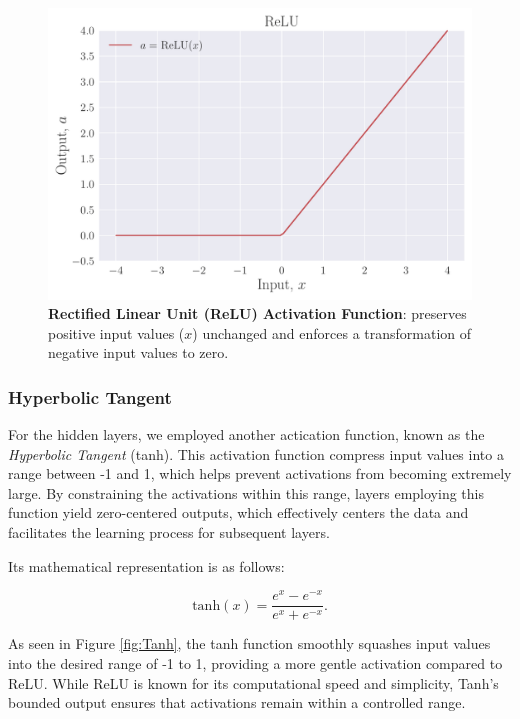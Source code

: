 \documentclass[a4paper, UKenglish, 11pt]{uiomaster}
\begin{document}
\begin{figure}
    \centering
    \includegraphics[width=\linewidth]{figures/ReLU.pdf}
    \caption{\textbf{Rectified Linear Unit (ReLU) Activation Function}: preserves positive input values ($x$) unchanged and enforces a transformation of negative input values to zero.}
    \label{fig:ReLU}
\end{figure}


\subsubsection{Hyperbolic Tangent}
For the hidden layers, we employed another actication function, known as the \emph{Hyperbolic Tangent} (tanh). This activation function compress input values into a range between -1 and 1, which helps prevent activations from becoming extremely large.  By constraining the activations within this range, layers employing this function yield zero-centered outputs, which effectively centers the data and facilitates the learning process for subsequent layers.

Its mathematical representation is as follows:

\begin{equation}
  \text{tanh}(x) = \frac{{e^x - e^{-x}}}{{e^x + e^{-x}}}.
\label{eq:I}
\end{equation}

As seen in Figure \ref{fig:Tanh}, the tanh function smoothly squashes input values into the desired range of -1 to 1, providing a more gentle activation compared to ReLU. While ReLU is known for its computational speed and simplicity, Tanh's bounded output ensures that activations remain within a controlled range.
\end{document}

